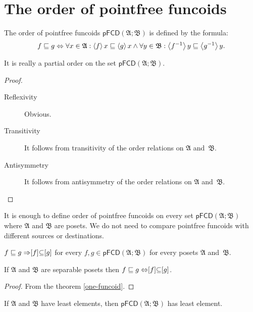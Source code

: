 \section{The order of pointfree funcoids}
\begin{defn}
The order of pointfree funcoids $\mathsf{pFCD}(\mathfrak{A};\mathfrak{B})$
is defined by the formula:
\[
f\sqsubseteq g\Leftrightarrow\forall x\in\mathfrak{A}:\left\langle f\right\rangle x\sqsubseteq\left\langle g\right\rangle x\land\forall y\in\mathfrak{B}:\left\langle f^{-1}\right\rangle y\sqsubseteq\left\langle g^{-1}\right\rangle y.
\]
\end{defn}
\begin{prop}
It is really a partial order on the set $\mathsf{pFCD}(\mathfrak{A};\mathfrak{B})$.\end{prop}
\begin{proof}
~
\begin{description}
\item [{Reflexivity}] Obvious.
\item [{Transitivity}] It follows from transitivity of the order relations
on $\mathfrak{A}$ and~$\mathfrak{B}$.
\item [{Antisymmetry}] It follows from antisymmetry of the order relations
on $\mathfrak{A}$ and~$\mathfrak{B}$.
\end{description}
\end{proof}
\begin{rem}
It is enough to define order of pointfree funcoids on every set $\mathsf{pFCD}(\mathfrak{A};\mathfrak{B})$
where $\mathfrak{A}$ and $\mathfrak{B}$ are posets. We do not need
to compare pointfree funcoids with different sources or destinations.\end{rem}
\begin{obvious}
$f\sqsubseteq g\Rightarrow\mathrel{\left[f\right]}\subseteq\mathrel{\left[g\right]}$ for every
$f,g\in\mathsf{pFCD}(\mathfrak{A};\mathfrak{B})$ for every posets
$\mathfrak{A}$ and~$\mathfrak{B}$.\end{obvious}
\begin{thm}
\label{pf-fcd-poset}If $\mathfrak{A}$ and $\mathfrak{B}$ are separable
posets then $f\sqsubseteq g\Leftrightarrow\mathrel{\left[f\right]}\subseteq\mathrel{\left[g\right]}$.\end{thm}
\begin{proof}
From the theorem \ref{one-funcoid}.\end{proof}
\begin{prop}
If $\mathfrak{A}$ and $\mathfrak{B}$ have least elements, then $\mathsf{pFCD}(\mathfrak{A};\mathfrak{B})$
has least element.\end{prop}
